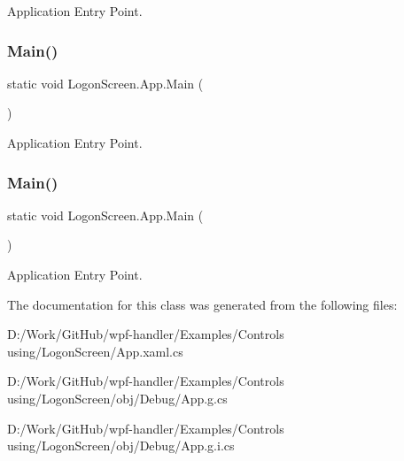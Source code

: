 Application Entry Point. 

\mbox{\label{class_logon_screen_1_1_app_a4bb5c1d89633dd3968144a0c9c897905}} 
\subsubsection{\texorpdfstring{Main()}{Main()}\hspace{0.1cm}{\footnotesize\ttfamily [3/4]}}
{\footnotesize\ttfamily static void Logon\+Screen.\+App.\+Main (\begin{DoxyParamCaption}{ }\end{DoxyParamCaption})\hspace{0.3cm}{\ttfamily [static]}}



Application Entry Point. 

\mbox{\label{class_logon_screen_1_1_app_a4bb5c1d89633dd3968144a0c9c897905}} 
\subsubsection{\texorpdfstring{Main()}{Main()}\hspace{0.1cm}{\footnotesize\ttfamily [4/4]}}
{\footnotesize\ttfamily static void Logon\+Screen.\+App.\+Main (\begin{DoxyParamCaption}{ }\end{DoxyParamCaption})\hspace{0.3cm}{\ttfamily [static]}}



Application Entry Point. 



The documentation for this class was generated from the following files\+:\begin{DoxyCompactItemize}
\item 
D\+:/\+Work/\+Git\+Hub/wpf-\/handler/\+Examples/\+Controls using/\+Logon\+Screen/App.\+xaml.\+cs\item 
D\+:/\+Work/\+Git\+Hub/wpf-\/handler/\+Examples/\+Controls using/\+Logon\+Screen/obj/\+Debug/App.\+g.\+cs\item 
D\+:/\+Work/\+Git\+Hub/wpf-\/handler/\+Examples/\+Controls using/\+Logon\+Screen/obj/\+Debug/App.\+g.\+i.\+cs\end{DoxyCompactItemize}
